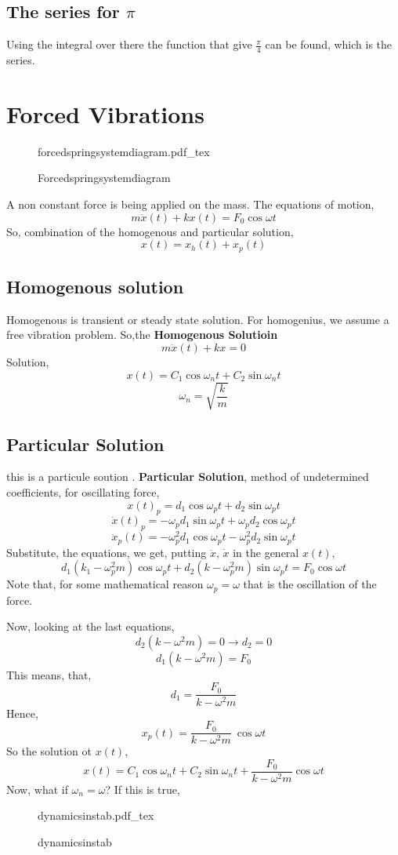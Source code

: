 \documentclass[a4paper, 11pt,twoside]{memoir}
\newcommand{\incfig}[1]{%
    \def\svgwidth{\columnwidth}
    {#1.pdf_tex}
}
\begin{document}
    \section{ The series for $\pi$ }
    Using the integral over there the function that give $\frac{\pi}{4}$ can be found, which is the series.  


    \chapter{ Forced Vibrations }
    \begin{figure}[ht]
    \centering
    \incfig{forcedspringsystemdiagram}
    \caption{Forcedspringsystemdiagram}
    \label{fig:forcedspringsystemdiagram}
\end{figure}

A non constant force is being applied on the mass. The equations of motion,
\[
    m \ddot{x}(t) + k x(t) = F_0 \cos \omega t
\]
So, combination of the homogenous and particular solution,
\[
    x(t) = x_h (t)  + x_p(t)
\]
\section{ Homogenous solution }
Homogenous is transient or steady state solution. For homogenius, we assume a free vibration problem. So,the \textbf{Homogenous Solutioin}
\[
    m \ddot{x}(t) + kx = 0
\]
Solution,
\[
    x(t) = C_1 \cos \omega_n t + C_2 \sin \omega_n t
\]
\[
\omega_n = \sqrt{\frac{k}{m}}
\]
\section{  Particular Solution       }
{ this is a particule soution }.
\textbf{Particular Solution}, method of undetermined coefficients, for oscillating force,
\[
    x(t)_p = d_1 \cos \omega_p t + d_2 \sin \omega_p t
\]
\[
    \dot{x} (t)_p = -\omega_p d_1 \sin \omega_p t + \omega_p d_2 \cos \omega_p t
\]
\[
    \ddot{x}_p (t) = -\omega_p^2 d_1 \cos \omega_p t - \omega_p ^2 d_2 \sin \omega_p t
\]
Substitute, the equations, we get, putting $ \ddot{x}$, $ \dot{x} $ in the general $x(t)$,
\[
    d_1 (k_1 - \omega_p^2 m ) \cos \omega_p t + d_2 ( k - \omega^2 _p m ) \sin \omega_p t = F_0 \cos \omega t
\]
Note that, for some mathematical reason $\omega_p = \omega$ that is the oscillation of the force.

Now, looking at the last equations,
\[
    d_2 \left( k - \omega^2 m \right) = 0 \to d_2 = 0
\]
\[
    d_1 \left( k - \omega^2 m  \right) = F_0
\]
This means, that,
\[
d_1 = \frac{F_0}{k - \omega ^2 m}
\]
Hence,
\[
    x_p (t) = \frac{F_0}{k - \omega^2 m} \ \cos \omega t
\]
So the solution ot $x(t)$,
\[
    x(t) = C_1 \cos \omega_n t + C_2 \sin \omega _n t + \frac{F_0}{k - \omega^2 m} \cos \omega t
\]
Now, what if $\omega_n = \omega$? If this is true,
\begin{figure}[ht]
    \centering
    \incfig{dynamicsinstab}
    \caption{dynamicsinstab}
    \label{fig:dynamicsinstab}
\end{figure}



        
\end{document}
